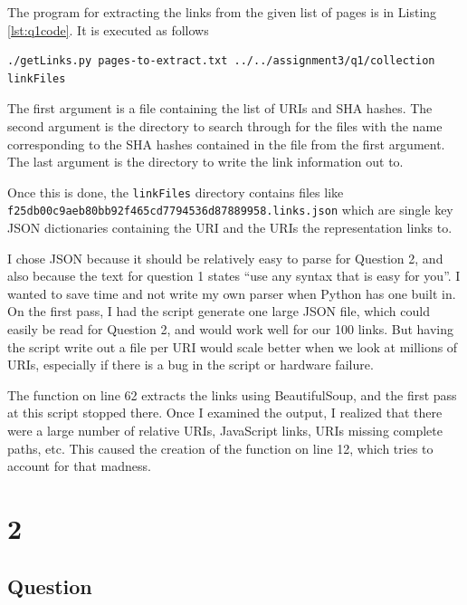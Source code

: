 \documentclass[letterpaper,11pt]{article}
\begin{document}
The program for extracting the links from the given list of pages is in Listing \ref{lst:q1code}.  It is executed as follows
\begin{lstlisting}[frame=single,basicstyle=\tiny]
./getLinks.py pages-to-extract.txt ../../assignment3/q1/collection linkFiles
\end{lstlisting}

The first argument is a file containing the list of URIs and SHA hashes.  The second argument is the directory to search through for the files with the name corresponding to the SHA hashes contained in the file from the first argument.  The last argument is the directory to write the link information out to.

Once this is done, the \verb+linkFiles+ directory contains files like \newline \verb+f25db00c9aeb80bb92f465cd7794536d87889958.links.json+ which are single key JSON dictionaries containing the URI and the URIs the representation links to.

I chose JSON because it should be relatively easy to parse for Question 2, and also because the text for question 1 states ``use any syntax that is easy for you''.  I wanted to save time and not write my own parser when Python has one built in.  On the first pass, I had the script generate one large JSON file, which could easily be read for Question 2, and would work well for our 100 links.  But having the script write out a file per URI would scale better when we look at millions of URIs, especially if there is a bug in the script or hardware failure.

The function on line 62 extracts the links using BeautifulSoup, and the first pass at this script stopped there.  Once I examined the output, I realized that there were a large number of relative URIs, JavaScript links, URIs missing complete paths, etc.  This caused the creation of the function on line 12, which tries to account for that madness.



\newpage


\newpage
\section*{2}

\subsection*{Question}
\end{document}
